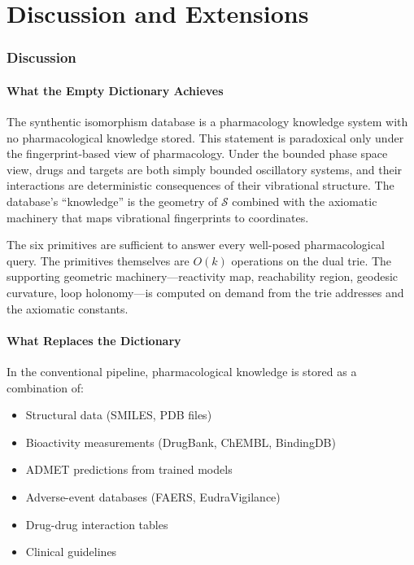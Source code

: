 \documentclass[11pt,twocolumn,a4paper]{article}
\theoremstyle{definition}
\theoremstyle{remark}
\newcommand{\Sspace}{\mathcal{S}}
\begin{document}
\part{Discussion and Extensions}

\section{Discussion}
\label{sec:discussion}

\subsection{What the Empty Dictionary Achieves}

The synthentic isomorphism database is a pharmacology knowledge system with no pharmacological knowledge stored. This statement is paradoxical only under the fingerprint-based view of pharmacology. Under the bounded phase space view, drugs and targets are both simply bounded oscillatory systems, and their interactions are deterministic consequences of their vibrational structure. The database's ``knowledge'' is the geometry of $\Sspace$ combined with the axiomatic machinery that maps vibrational fingerprints to coordinates.

The six primitives are sufficient to answer every well-posed pharmacological query. The primitives themselves are $O(k)$ operations on the dual trie. The supporting geometric machinery---reactivity map, reachability region, geodesic curvature, loop holonomy---is computed on demand from the trie addresses and the axiomatic constants.

\subsection{What Replaces the Dictionary}

In the conventional pipeline, pharmacological knowledge is stored as a combination of:
\begin{itemize}[nosep,leftmargin=*]
\item Structural data (SMILES, PDB files)
\item Bioactivity measurements (DrugBank, ChEMBL, BindingDB)
\item ADMET predictions from trained models
\item Adverse-event databases (FAERS, EudraVigilance)
\item Drug-drug interaction tables
\item Clinical guidelines
\end{itemize}
\end{document}
